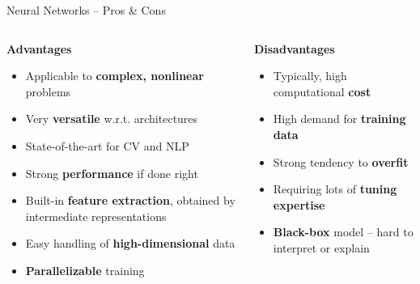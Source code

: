 \documentclass[11pt,compress,t,notes=noshow, xcolor=table]{beamer}
\newcommand{\highlight}[1]{\textcolor{hlcol}{\textbf{#1}}}
\newcommand{\positem}{\item[\textcolor{hlcol}{$\bm{+}$}]}
\newcommand{\negitem}{\item[\textcolor{hlcol}{$\bm{-}$}]}
\begin{document}
\begin{vbframe}
  {Neural Networks -- Pros \& Cons}

\footnotesize

\begin{columns}[onlytextwidth]
  \begin{column}{0.5\textwidth}
    \highlight{Advantages}
    \footnotesize
    \begin{itemize}
      \positem Applicable to \textbf{complex, nonlinear} problems
      \positem Very \textbf{versatile} w.r.t. architectures
      \positem State-of-the-art for CV and NLP
      \positem Strong \textbf{performance} if done right
      \positem Built-in \textbf{feature extraction}, obtained by intermediate
      representations
      \positem Easy handling of \textbf{high-dimensional} data
      \positem \textbf{Parallelizable} training 
    \end{itemize}
  \end{column}

  \begin{column}{0.5\textwidth}
    \highlight{Disadvantages}
    \footnotesize
    \begin{itemize}
      \negitem Typically, high computational \textbf{cost}
      \negitem High demand for \textbf{training data} 
      \negitem Strong tendency to \textbf{overfit}
      \negitem Requiring lots of \textbf{tuning expertise} 
      \negitem \textbf{Black-box} model -- hard to interpret or explain
    \end{itemize}
  \end{column}
\end{columns}
\end{vbframe}


\endlecture
\end{document}
